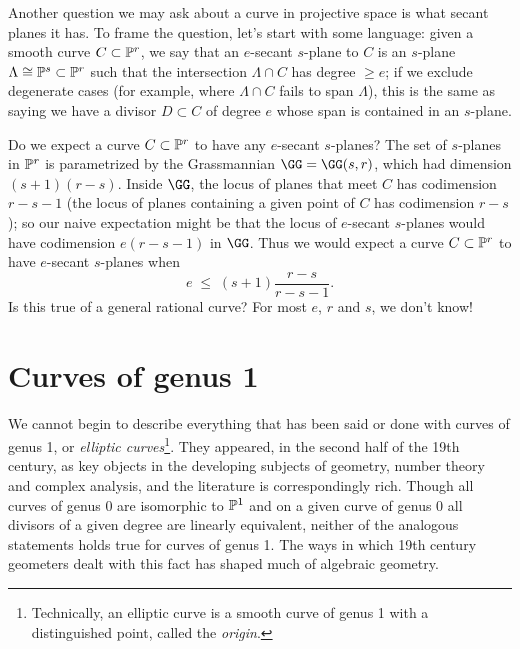 Another question we may ask about a curve in projective space is what secant planes it has. To frame the question, let's start with some language: given a smooth curve $C \subset \PP^r$, we say that an $e$-secant $s$-plane to $C$ is an $s$-plane $\Lambda \cong \PP^s \subset \PP^r$ such that the intersection $\Lambda \cap C$ has degree $\geq e$; if we exclude degenerate cases (for example, where $\Lambda \cap C$ fails to span $\Lambda$), this is the same as saying we have a divisor $D \subset C$ of degree $e$ whose span is contained in an $s$-plane.

Do we expect a curve $C \subset \PP^r$ to have any $e$-secant $s$-planes? The set of $s$-planes in $\PP^r$ is parametrized by the Grassmannian $\GG = \GG(s,r)$, which had dimension $(s+1)(r-s)$. Inside $\GG$, the locus of planes that meet $C$ has codimension $r-s-1$ (the locus of planes containing a given point of $C$ has codimension $r-s$); so our naive expectation might be that the locus of $e$-secant $s$-planes would have codimension $e(r-s-1)$ in $\GG$. Thus we would expect a curve $C \subset \PP^r$ to have $e$-secant $s$-planes when 
$$
e \; \leq \; (s+1)\frac{r-s}{r-s-1}.
$$
Is this true of a general rational curve? For most $e$, $r$ and $s$, we don't know!

\section{Curves of genus 1}


We cannot begin to describe everything that has been said or done with curves of genus 1, or \emph{elliptic curves}\footnote{Technically, an elliptic curve is a smooth curve of genus 1 with a distinguished point, called the \emph{origin}.}. They appeared, in the second half of the 19th century, as key objects in the developing subjects of geometry, number theory and complex analysis, and the literature is correspondingly rich. Though all curves of genus 0 are isomorphic to $\PP^1$ and on a given curve of genus 0 all divisors of a given degree are linearly equivalent, neither of the analogous statements holds true for curves of genus 1. The ways in which 19th century geometers dealt with this fact has shaped much of algebraic geometry.

